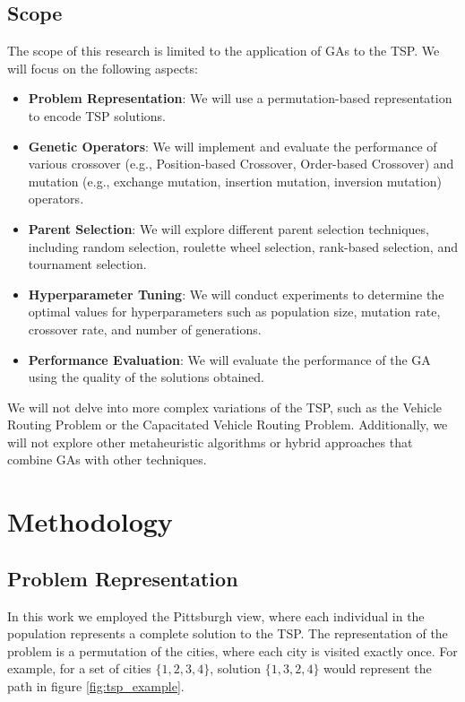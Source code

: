\documentclass[11pt]{article}
\begin{document}
\subsection{Scope}

The scope of this research is limited to the application of GAs to the TSP. We will focus on the following aspects:

\begin{itemize}
    \item \textbf{Problem Representation}: We will use a permutation-based representation to encode TSP solutions.
    \item \textbf{Genetic Operators}: We will implement and evaluate the performance of various crossover (e.g., Position-based Crossover, Order-based Crossover) and mutation (e.g., exchange mutation, insertion mutation, inversion mutation) operators.
    \item \textbf{Parent Selection}: We will explore different parent selection techniques, including random selection, roulette wheel selection, rank-based selection, and tournament selection.
    \item \textbf{Hyperparameter Tuning}: We will conduct experiments to determine the optimal values for hyperparameters such as population size, mutation rate, crossover rate, and number of generations.
    \item \textbf{Performance Evaluation}: We will evaluate the performance of the GA using the quality of the solutions obtained. 
\end{itemize}

We will not delve into more complex variations of the TSP, such as the Vehicle Routing Problem or the Capacitated Vehicle Routing Problem. Additionally, we will not explore other metaheuristic algorithms or hybrid approaches that combine GAs with other techniques.

\section{Methodology}
\subsection{Problem Representation}
In this work we employed the Pittsburgh view, where each individual in the population represents a complete solution to the TSP. The representation of the problem is a permutation of the cities, where each city is visited exactly once. For example, for a set of cities $\{1,2,3,4\}$, solution $\{1,3,2,4\}$ would represent the path in figure \ref{fig:tsp_example}.
\end{document}
